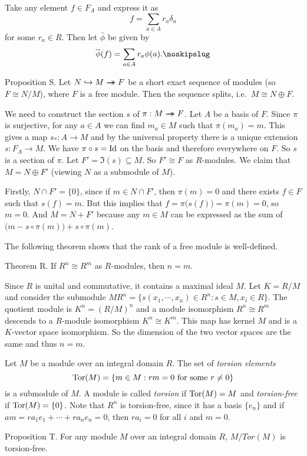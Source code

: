 \proof Take any element $f\in F_A$ and express it as
$$f = \sum_{a\in A} r_a\delta_a$$
for some $r_a\in R$. Then let $\bar\phi$ be given by
$$\bar\phi(f) = \sum_{a\in A} r_a\phi(a).\noskipslug$$

\proclaim Proposition S. Let $N\hookrightarrow M \rightarrow\!\!\!\!\!\rightarrow F$ be a short exact sequence of modules (so $F \cong N/M$), where $F$ is a free module. Then the sequence splits, i.e.\ $M\cong N\oplus F$.

\proof We need to construct the section $s$ of $\pi : M\rightarrow\!\!\!\!\!\rightarrow F$. Let $A$ be a basis of $F$. Since $\pi$ is surjective, for any $a\in A$ we can find $m_a\in M$ such that $\pi(m_a) = m$. This gives a map $s_* : A \to M$ and by the universal property there is a unique extension $s : F_A\to M$. We have $\pi \circ s = \mathop {\rm Id}$ on the basis and therefore everywhere on $F$. So $s$ is a section of $\pi$. Let $F' = \Im(s) \subseteq M$. So $F'\cong F$ as $R$-modules. We claim that $M = N\oplus F'$ (viewing $N$ as a submodule of $M$).

Firstly, $N\cap F' = \{0\}$, since if $m\in N\cap F'$, then $\pi(m) = 0$ and there exists $f\in F$ such that $s(f) = m$. But this implies that $f = \pi\big(s(f)\big) = \pi(m) = 0$, so $m=0$. And $M = N + F'$ because any $m\in M$ can be expressed as the sum of $\big(m-s\circ \pi(m)\big) + s\circ\pi (m)$.\slug

The following theorem shows that the rank of a free module is well-defined.

\proclaim Theorem R. If $R^n\cong R^m$ as $R$-modules, then $n = m$.

\proof Since $R$ is unital and commutative, it contains a maximal ideal $M$. Let $K = R/M$ and consider the submodule $MR^n = \big\{s(x_1,\cdots,x_n) \in R^n: s\in M, x_i\in R\big\}$. The quotient module is $K^n = (R/M)^n$ and a module isomorphism $R^n \cong R^m$ descends to a $R$-module isomorphism $K^n \cong K^m$. This map has kernel $M$ and is a $K$-vector space isomorphism. So the dimension of the two vector spaces are the same and thus $n=m$.\slug

Let $M$ be a module over an integral domain $R$. The set of {\it torsion elements}
$$\Tor(M) = \{m\in M : rm = 0\ \hbox{for some}\ r\neq 0\}$$
is a submodule of $M$. A module is called {\it torsion} if $\mathop {\rm Tor}(M) = M$ and {\it torsion-free} if $\mathop {\rm Tor}(M) = \{0\}$. Note that $R^n$ is torsion-free, since it has a basis $\{e_n\}$ and if $am = ra_1e_1 + \cdots + ra_ne_n = 0$, then $ra_i = 0$ for all $i$ and $m = 0$.

\proclaim Proposition T. For any module $M$ over an integral domain $R$, $M/Tor(M)$ is torsion-free.

